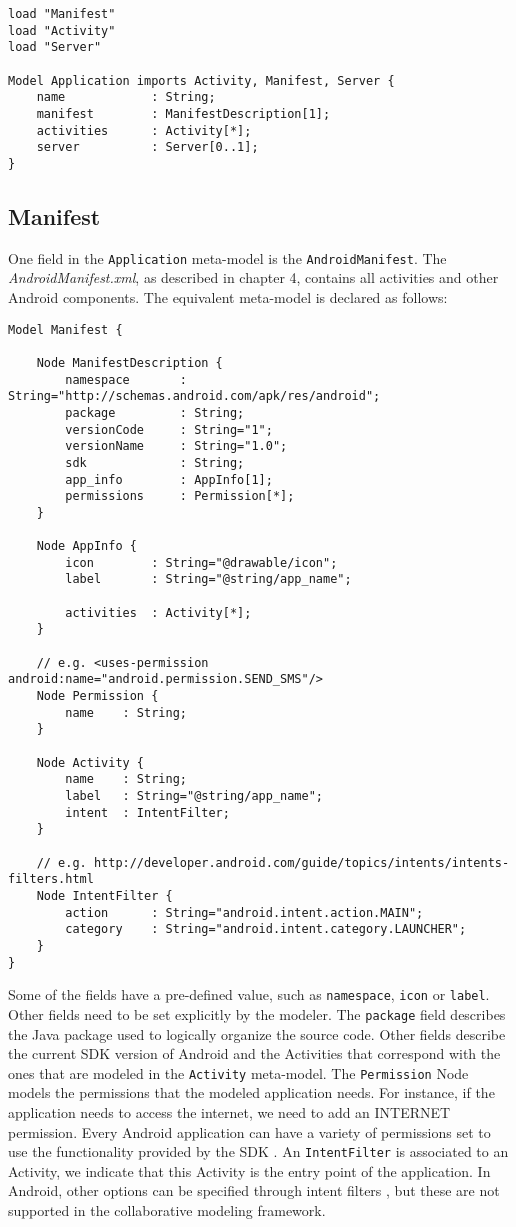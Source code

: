 \begin{lstlisting}[label=application-mm,caption=Application meta-model, captionpos=t]
load "Manifest"
load "Activity"
load "Server"

Model Application imports Activity, Manifest, Server {
	name			: String;
	manifest		: ManifestDescription[1];
	activities		: Activity[*];
	server 			: Server[0..1];
}
\end{lstlisting}

\subsection{Manifest}

One field in the \texttt{Application} meta-model is the \texttt{AndroidManifest}. The \textit{AndroidManifest.xml}, as described in chapter 4, contains all activities and other Android components. The equivalent meta-model is declared as follows:

\begin{lstlisting}[label=application-mm,caption=Manifest meta-model, captionpos=t]
Model Manifest {

	Node ManifestDescription {
		namespace		: String="http://schemas.android.com/apk/res/android";
		package			: String;
		versionCode		: String="1";
		versionName		: String="1.0";
		sdk				: String;
		app_info		: AppInfo[1];
		permissions		: Permission[*];
	}

	Node AppInfo {
		icon 		: String="@drawable/icon";
		label		: String="@string/app_name";

		activities	: Activity[*];
	}

	// e.g. <uses-permission android:name="android.permission.SEND_SMS"/>
	Node Permission {
		name 	: String;
	}

	Node Activity {
		name 	: String;
		label 	: String="@string/app_name";
		intent	: IntentFilter;
	}

	// e.g. http://developer.android.com/guide/topics/intents/intents-filters.html
	Node IntentFilter {
		action 		: String="android.intent.action.MAIN";
		category	: String="android.intent.category.LAUNCHER";
	}
}
\end{lstlisting}
Some of the fields have a pre-defined value, such as \texttt{namespace}, \texttt{icon} or \texttt{label}. Other fields need to be set explicitly by the modeler. The \texttt{package} field describes the Java package used to logically organize the source code. Other fields describe the current SDK version of Android and the Activities that correspond with the ones that are modeled in the \texttt{Activity} meta-model. The \texttt{Permission} Node models the permissions that the modeled application needs. For instance, if the application needs to access the internet, we need to add an INTERNET permission. Every Android application can have a variety of permissions set to use the functionality provided by the SDK \cite{AndroidPermissions}. An \texttt{IntentFilter} is associated to an Activity, we indicate that this Activity is the entry point of the application. In Android, other options can be specified through intent filters \cite{AndroidIntentFilter}, but these are not supported in the collaborative modeling framework.

